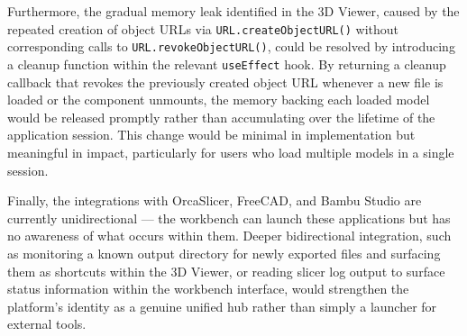 \documentclass[a4paper,12pt]{article}
\begin{document}
Furthermore, the gradual memory leak identified in the 3D Viewer, caused by the 
repeated creation of object URLs via \texttt{URL.createObjectURL()} 
without corresponding calls to \texttt{URL.revokeObjectURL()}, could 
be resolved by introducing a cleanup function within the relevant 
\texttt{useEffect} hook. By returning a cleanup callback that revokes 
the previously created object URL whenever a new file is loaded or the 
component unmounts, the memory backing each loaded model would be 
released promptly rather than accumulating over the lifetime of the 
application session. This change would be minimal in implementation 
but meaningful in impact, particularly for users who load multiple 
models in a single session.

Finally, the integrations with OrcaSlicer, FreeCAD, and Bambu Studio are currently unidirectional — the workbench can launch these applications but has no awareness of what occurs within them. Deeper bidirectional integration, such as monitoring a known output directory for newly exported files and surfacing them as shortcuts within the 3D Viewer, or reading slicer log output to surface status information within the workbench interface, would strengthen the platform's identity as a genuine unified hub rather than simply a launcher for external tools.

\newpage
\listoffigures

\newpage
\end{document}
